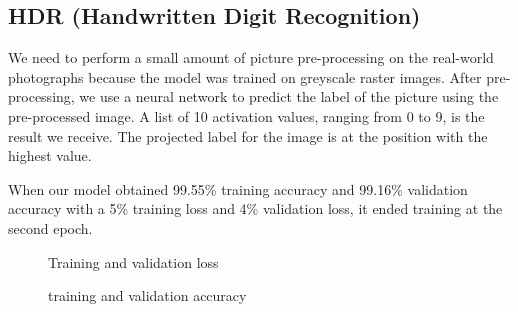 \documentclass[letterpaper, 10 pt, conference]{ieeeconf}  %
\begin{document}
\subsection*{\bf HDR (Handwritten Digit Recognition)}
We need to perform a small amount of picture pre-processing on the real-world photographs because the model was trained on greyscale raster images. After pre-processing, we use a neural network to predict the label of the picture using the pre-processed image. A list of 10 activation values, ranging from 0 to 9, is the result we receive. The projected label for the image is at the position with the highest value. \par

When our model obtained 99.55\% training accuracy and 99.16\% validation accuracy with a 5\% training loss and 4\% validation loss, it ended training at the second epoch. \par

\begin{figure}[thpb]
      \centering
      \caption{Training and validation loss}
      \label{fig:1}
\end{figure}

\begin{figure}[thpb]
      \centering
      \caption{training and validation accuracy}
      \label{fig:1}
\end{figure}
\end{document}
